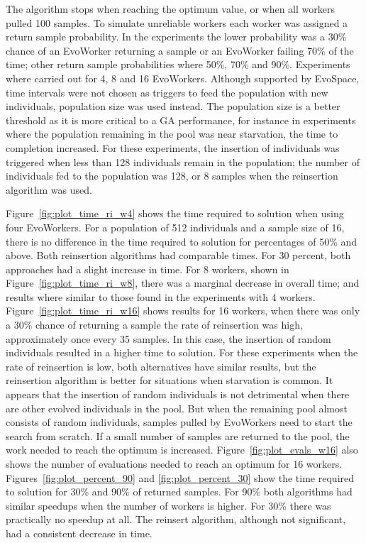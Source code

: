 The algorithm stops when reaching the optimum value, or when all workers
pulled 100 samples. To simulate unreliable workers each worker was assigned a
return sample probability. In the experiments the lower probability was a 30\%
chance of an EvoWorker returning a sample or an EvoWorker failing 70\% of the
time; other return sample probabilities where 50\%, 70\% and 90\%. Experiments
where carried out for 4, 8 and 16 EvoWorkers.
Although supported by EvoSpace, time intervals were not chosen as triggers
to feed the population with new individuals, population size was used instead.
The population size is a better threshold as it is more critical
to a GA performance, for instance in experiments where the population remaining in the pool was near starvation, the time to completion increased.
For these experiments, the insertion of individuals was triggered when less than
128 individuals remain in the population; the number of individuals fed to the
population was 128, or 8 samples when the reinsertion algorithm was used.


Figure~\ref{fig:plot_time_ri_w4} shows the time required 
to solution when using four EvoWorkers. For a population of
512 individuals and a sample size of 16, there is no
difference in the time required to solution for 
percentages of 50\% and above. Both reinsertion algorithms
had comparable times. For 30 percent, both approaches 
had a slight increase in time. For 8 workers, shown in Figure~\ref{fig:plot_time_ri_w8},  there was a marginal
decrease in overall time; and results where similar to those found in the experiments with 4 workers.  
Figure~\ref{fig:plot_time_ri_w16} shows results for 16 workers,
when there was only a 30\% chance of returning a sample the rate of reinsertion was high, approximately once every 35 samples.
In this case, the insertion of random individuals resulted in a higher time to solution.
For these experiments when the rate of reinsertion is low, both alternatives
have similar results, but the reinsertion algorithm is better
for situations when starvation is common.
It appears that the insertion of random individuals is not detrimental when there
are other evolved individuals in the pool. But when the remaining
pool almost consists of random individuals, samples pulled by
EvoWorkers need to start the search from scratch. 
If a small number of samples are returned to the pool, the work needed to reach the
optimum is increased. Figure~\ref{fig:plot_evals_w16} also shows the number 
of evaluations needed to reach an optimum for 16 workers.
Figures~\ref{fig:plot_percent_90} and \ref{fig:plot_percent_30} show
the time required to solution for 30\% and 90\% of returned samples.
For 90\% both algorithms had similar speedups when the number of
workers is higher.
For 30\% there was practically no speedup at all. The reinsert algorithm,
although not significant, had a consistent decrease in time.         

